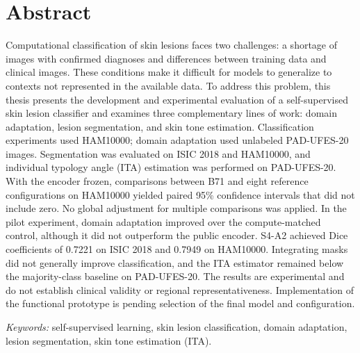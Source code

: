 \chapter*{Abstract}
\noindent
Computational classification of skin lesions faces two challenges: a shortage of images with confirmed diagnoses and differences between training data and clinical images. These conditions make it difficult for models to generalize to contexts not represented in the available data. To address this problem, this thesis presents the development and experimental evaluation of a self-supervised skin lesion classifier and examines three complementary lines of work: domain adaptation, lesion segmentation, and skin tone estimation. Classification experiments used HAM10000; domain adaptation used unlabeled PAD-UFES-20 images. Segmentation was evaluated on ISIC 2018 and HAM10000, and individual typology angle (ITA) estimation was performed on PAD-UFES-20. With the encoder frozen, comparisons between B71 and eight reference configurations on HAM10000 yielded paired 95\% confidence intervals that did not include zero. No global adjustment for multiple comparisons was applied. In the pilot experiment, domain adaptation improved over the compute-matched control, although it did not outperform the public encoder. S4-A2 achieved Dice coefficients of 0.7221 on ISIC 2018 and 0.7949 on HAM10000. Integrating masks did not generally improve classification, and the ITA estimator remained below the majority-class baseline on PAD-UFES-20. The results are experimental and do not establish clinical validity or regional representativeness. Implementation of the functional prototype is pending selection of the final model and configuration.

\par\smallskip\noindent\hspace*{1.27cm}\textit{Keywords:} self-supervised learning, skin lesion classification, domain adaptation, lesion segmentation, skin tone estimation (ITA).\par

